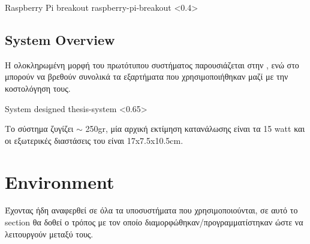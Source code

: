 %
{Raspberry Pi breakout}%
{raspberry-pi-breakout}%
<0.4>


\subsection{System Overview}
Η ολοκληρωμένη μορφή του πρωτότυπου συστήματος παρουσιάζεται στην , ενώ στο  μπορούν να βρεθούν συνολικά τα εξαρτήματα που χρησιμοποιήθηκαν μαζί με την κοστολόγηση τους. 

{System designed}%
{thesis-system}%
<0.65>

Το σύστημα ζυγίζει $\sim$ 250gr, μία αρχική εκτίμηση κατανάλωσης είναι τα 15 watt και οι εξωτερικές διαστάσεις του είναι 17x7.5x10.5cm.

\begin{table}[H]
    \caption[]{Bill of Materials}
    \label{tab:thesis-system-bom}
    \centering
  \end{table}


\section{Environment}
Έχοντας ήδη αναφερθεί σε όλα τα υποσυστήματα που χρησιμοποιούνται, σε αυτό το section θα δοθεί ο τρόπος με τον οποίο διαμορφώθηκαν/προγραμματίστηκαν ώστε να λειτουργούν μεταξύ τους.

